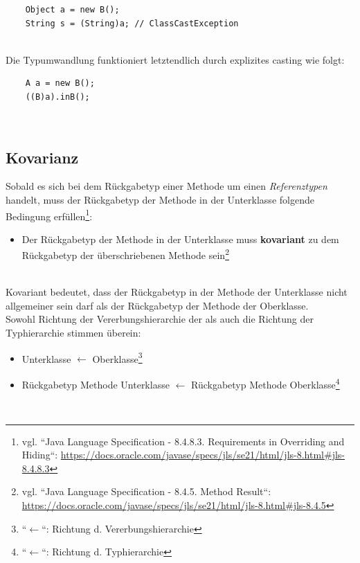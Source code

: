 \begin{verbatim}
    Object a = new B();
    String s = (String)a; // ClassCastException
\end{verbatim}\\

\noindent
Die Typumwandlung funktioniert letztendlich durch explizites casting wie folgt:

\begin{verbatim}
    A a = new B();
    ((B)a).inB();
\end{verbatim}\\


\subsection{Kovarianz}\label{subsec:covariance}
Sobald es sich bei dem Rückgabetyp einer Methode um einen \textit{Referenztypen} handelt, muss der Rückgabetyp der Methode in der Unterklasse folgende Bedingung erfüllen\footnote{
    vgl. ``Java Language Specification - 8.4.8.3. Requirements in Overriding and Hiding``: \url{https://docs.oracle.com/javase/specs/jls/se21/html/jls-8.html#jls-8.4.8.3}
}:

\begin{itemize}
    \item Der Rückgabetyp der Methode in der Unterklasse muss \textbf{kovariant} zu dem Rückgabetyp der überschriebenen Methode sein\footnote{
        vgl. ``Java Language Specification - 8.4.5. Method Result``: \url{https://docs.oracle.com/javase/specs/jls/se21/html/jls-8.html#jls-8.4.5}
    }
\end{itemize}\\

\noindent
Kovariant bedeutet, dass der Rückgabetyp in der Methode der Unterklasse nicht allgemeiner sein darf als der Rückgabetyp der Methode der Oberklasse.\\
Sowohl Richtung der Vererbungshierarchie der als auch die Richtung der Typhierarchie stimmen überein:

\begin{itemize}
    \item Unterklasse $\leftarrow$ Oberklasse\footnote{
        ``$\leftarrow$``: Richtung d. Vererbungshierarchie
    }
    \item Rückgabetyp Methode Unterklasse $\leftarrow$ Rückgabetyp Methode Oberklasse\footnote{
        ``$\leftarrow$``: Richtung d. Typhierarchie
    }
\end{itemize}\\

